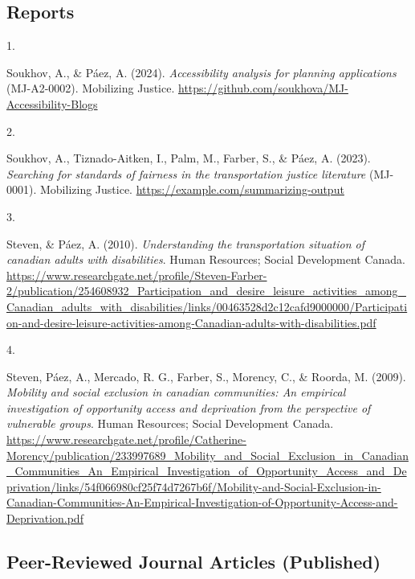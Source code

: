 \documentclass[11pt,a4paper,]{awesome-cv}
\newlength{\cslhangindent}
\newlength{\csllabelwidth}
\newenvironment{CSLReferences}[2] %
 {\begin{list}{}{%
  \setlength{\itemindent}{0pt}
  \setlength{\leftmargin}{0pt}
  \setlength{\parsep}{0pt}
  \ifodd #1
   \setlength{\leftmargin}{\cslhangindent}
   \setlength{\itemindent}{-1\cslhangindent}
  \fi
  \setlength{\itemsep}{#2\baselineskip}}}
 {\end{list}}
\newcommand{\CSLLeftMargin}[1]{\parbox[t]{\csllabelwidth}{\strut#1\strut}}
\newcommand{\CSLRightInline}[1]{\parbox[t]{\linewidth - \csllabelwidth}{\strut#1\strut}}
\begin{document}
\subsection{Reports}\label{reports}

\label{refs-a73ec60e58689bbc3e562183c5b03f80}
\begin{CSLReferences}{0}{0}
\CSLLeftMargin{1. }%
\CSLRightInline{Soukhov, A., \& Páez, A. (2024). \emph{Accessibility
analysis for planning applications} (MJ-A2-0002). Mobilizing Justice.
\url{https://github.com/soukhova/MJ-Accessibility-Blogs}}

\CSLLeftMargin{2. }%
\CSLRightInline{Soukhov, A., Tiznado-Aitken, I., Palm, M., Farber, S.,
\& Páez, A. (2023). \emph{Searching for standards of fairness in the
transportation justice literature} (MJ-0001). Mobilizing Justice.
\url{https://example.com/summarizing-output}}

\CSLLeftMargin{3. }%
\CSLRightInline{Steven, \& Páez, A. (2010). \emph{Understanding the
transportation situation of canadian adults with disabilities}. Human
Resources; Social Development Canada.
\url{https://www.researchgate.net/profile/Steven-Farber-2/publication/254608932_Participation_and_desire_leisure_activities_among_Canadian_adults_with_disabilities/links/00463528d2c12cafd9000000/Participation-and-desire-leisure-activities-among-Canadian-adults-with-disabilities.pdf}}

\CSLLeftMargin{4. }%
\CSLRightInline{Steven, Páez, A., Mercado, R. G., Farber, S., Morency,
C., \& Roorda, M. (2009). \emph{Mobility and social exclusion in
canadian communities: An empirical investigation of opportunity access
and deprivation from the perspective of vulnerable groups}. Human
Resources; Social Development Canada.
\url{https://www.researchgate.net/profile/Catherine-Morency/publication/233997689_Mobility_and_Social_Exclusion_in_Canadian_Communities_An_Empirical_Investigation_of_Opportunity_Access_and_Deprivation/links/54f066980cf25f74d7267b6f/Mobility-and-Social-Exclusion-in-Canadian-Communities-An-Empirical-Investigation-of-Opportunity-Access-and-Deprivation.pdf}}

\end{CSLReferences}

\subsection{Peer-Reviewed Journal Articles
(Published)}\label{peer-reviewed-journal-articles-published}
\end{document}
